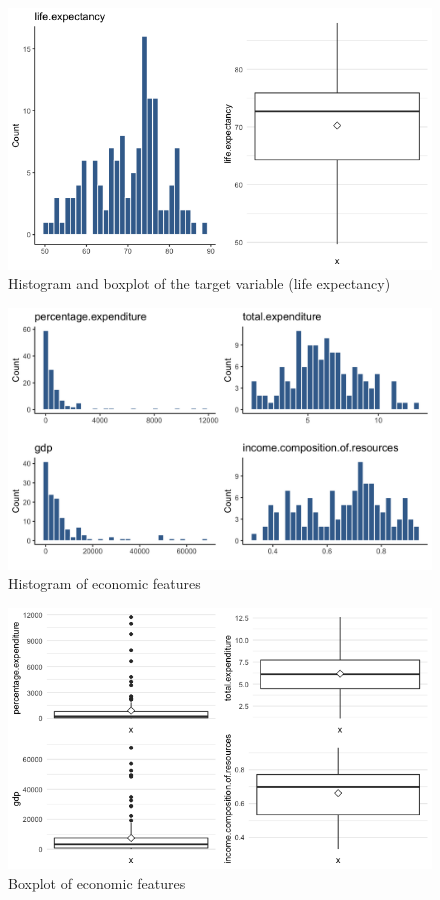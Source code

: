 \begin{figure}[H]
	\centering
	\includegraphics{figures/eda/histogram_boxplot_target.png}
	\caption{Histogram and boxplot of the target variable (life expectancy)}
	\label{fig:histogram_boxplot_target}
\end{figure}


\begin{figure}[H]
	\centering
	\includegraphics{figures/eda/histogram_economic_features.png}
	\caption{Histogram of economic features}
	\label{fig:histogram_economic_features}
\end{figure}

\begin{figure}[H]
	\centering
	\includegraphics{figures/eda/boxplot_economic_features.png}
	\caption{Boxplot of economic features}
	\label{fig:boxplot_economic_features}
\end{figure}

